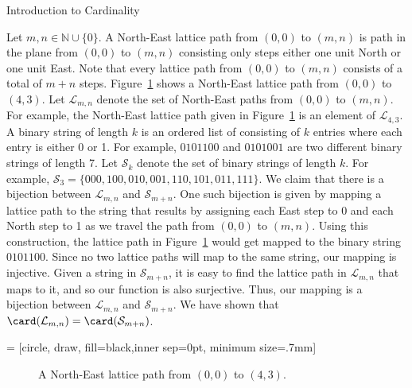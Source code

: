 \begin{section}{Introduction to Cardinality}
\begin{example}
Let $m,n\in\mathbb{N}\cup\{0\}$. A North-East lattice path from $(0,0)$ to $(m,n)$ is path in the plane from $(0,0)$ to $(m,n)$ consisting only steps either one unit North or one unit East. Note that every lattice path from $(0,0)$ to $(m,n)$ consists of a total of $m+n$ steps.  Figure~\ref{fig:lattice path} shows a North-East lattice path from $(0,0)$ to $(4,3)$. Let $\mathcal{L}_{m,n}$ denote the set of North-East paths from $(0,0)$ to $(m,n)$. For example, the North-East lattice path given in Figure~\ref{fig:lattice path} is an element of $\mathcal{L}_{4,3}$. A binary string of length $k$ is an ordered list of consisting of $k$ entries where each entry is either 0 or 1.  For example, $0101100$ and $0101001$ are two different binary strings of length 7. Let $\mathcal{S}_k$ denote the set of binary strings of length $k$. For example, $\mathcal{S}_3=\{000, 100,010,001,110,101,011,111\}$. We claim that there is a bijection between $\mathcal{L}_{m,n}$ and $\mathcal{S}_{m+n}$.  One such bijection is given by mapping a lattice path to the string that results by assigning each East step to 0 and each North step to 1 as we travel the path from $(0,0)$ to $(m,n)$.  Using this construction, the lattice path in Figure~\ref{fig:lattice path} would get mapped to the binary string $0101100$. Since no two lattice paths will map to the same string, our mapping is injective.  Given a string in $\mathcal{S}_{m+n}$, it is easy to find the lattice path in $\mathcal{L}_{m,n}$ that maps to it, and so our function is also surjective.  Thus, our mapping is a bijection between $\mathcal{L}_{m,n}$ and $\mathcal{S}_{m+n}$.  We have shown that $\card(\mathcal{L}_{m,n})=\card(\mathcal{S}_{m+n})$.
\end{example}

 = [circle, draw, fill=black,inner sep=0pt, minimum size=.7mm]

\begin{figure}[h!]
\centering
{}
\caption{A North-East lattice path from $(0,0)$ to $(4,3)$.}\label{fig:lattice path}
\end{figure}


\end{section}
